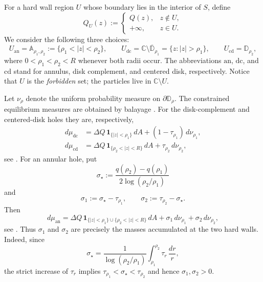 \documentclass[a4paper]{article}
\newcommand{\C}{\mathbb{C}}
\numberwithin{equation}{section}
\begin{document}
For a hard wall region $U$ whose boundary lies in the interior of $S$, define
\begin{equation}
Q_U(z):=
\begin{cases}
Q(z),&z\notin U,\\
+\infty,&z\in U.
\end{cases}
\end{equation}
We consider the following three choices:
\begin{equation}
\label{def of hole region}
U_{\mathrm{an}}=\mathbb A_{\rho_1,\rho_2}:=\{\rho_1<|z|<\rho_2\},
\qquad
U_{\mathrm{dc}}=\C\setminus\overline{\mathbb D}_{\rho_1}
=\{z:|z|>\rho_1\},
\qquad
U_{\mathrm{cd}}=\mathbb D_{\rho_2},
\end{equation}
where $0<\rho_1<\rho_2<R$ whenever both radii occur.  The abbreviations $\mathrm{an}$, $\mathrm{dc}$, and $\mathrm{cd}$ stand for annulus, disk complement, and centered disk, respectively.  Notice that $U$ is the \emph{forbidden} set; the particles live in $\C\setminus U$.

Let $\nu_\rho$ denote the uniform probability measure on $\partial\mathbb D_\rho$.  The constrained equilibrium measures are obtained by balayage \cite{C2023}.  For the disk-complement and centered-disk holes they are, respectively,
\begin{align}
d\mu_{\mathrm{dc}}
&=\Delta Q\,\mathbf 1_{\{|z|<\rho_1\}}\,dA
+(1-\tau_{\rho_1})\,d\nu_{\rho_1},
\\
d\mu_{\mathrm{cd}}
&=\Delta Q\,\mathbf 1_{\{\rho_2<|z|<R\}}\,dA
+\tau_{\rho_2}\,d\nu_{\rho_2},
\end{align} 
see \cite[Theorem 2.10 and 2.14]{C2023}.
For an annular hole, put
\begin{equation}
\label{def of sigma star}
\sigma_\star
:=
\frac{q(\rho_2)-q(\rho_1)}{2\log(\rho_2/\rho_1)}
\end{equation}
and
\begin{equation}
\label{def of sigma1 sigma2}
\sigma_1:=\sigma_\star-\tau_{\rho_1},
\qquad
\sigma_2:=\tau_{\rho_2}-\sigma_\star.
\end{equation}
Then
\begin{equation}
\label{def of equi measure annulus hole}
d\mu_{\mathrm{an}}
=
\Delta Q\,\mathbf 1_{\{|z|<\rho_1\}\cup\{\rho_2<|z|<R\}}\,dA
+\sigma_1\,d\nu_{\rho_1}
+\sigma_2\,d\nu_{\rho_2},
\end{equation}
see \cite[Theorem 2.12]{C2023}.
Thus $\sigma_1$ and $\sigma_2$ are precisely the masses accumulated at the
two hard walls.  Indeed, since
\[
\sigma_\star
=\frac{1}{\log(\rho_2/\rho_1)}
  \int_{\rho_1}^{\rho_2}\tau_r\,\frac{dr}{r},
\]
the strict increase of $\tau_r$ implies
$\tau_{\rho_1}<\sigma_\star<\tau_{\rho_2}$ and hence
$\sigma_1,\sigma_2>0$.
\end{document}

